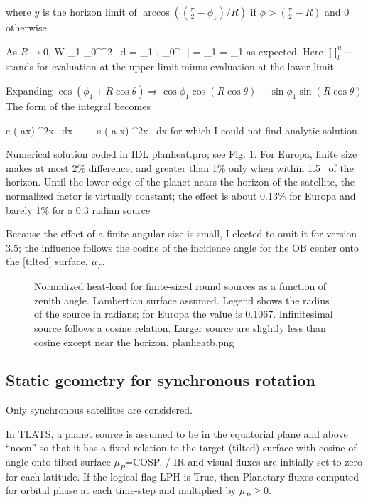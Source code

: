\documentclass{article}
\begin{document}
where  $y $ is the horizon limit of $\arccos \left( (\frac{\pi}{2}-\phi_1)/R \right)$ if $\phi > (\frac{\pi}{2}-R)$ and 0 otherwise.

As $R \rightarrow 0$, 
\qb W  \rightarrow  {} \cos \phi_1 \int_0^\pi \sin^2 \theta \ d \theta
 =  \cos \phi_1   \left. \coprod_0^\pi {}-  \right] 
=  \cos \phi_1 \cdot {}  = \cos \phi_1  \qe
as expected. Here $ \coprod _l^u \cdots \ ] $ stands for evaluation at the upper
  limit minus evaluation at the lower limit

\vspace{2mm}

Expanding $ \cos (\phi_1 + R \cos \theta ) \Rightarrow  \cos \phi_1 \cos( R \cos \theta ) -   \sin \phi_1 \sin( R \cos \theta ) $ The form of the integral becomes 

\qb c \int \cos ( a\cos x) \sin^2x \ dx \ + \ s \int  \sin ( a \cos x) \sin^2x \ dx \qe
 for which I could not find analytic solution.

Numerical solution coded in IDL planheat.pro; see Fig. \ref{planheatb}. For
Europa, finite size makes at most 2\% difference, and greater than 1\% only when
within 1.5\qd~ of the horizon.  Until the lower edge of the planet nears the
horizon of the satellite, the normalized factor is virtually constant; the
effect is about 0.13\% for Europa and barely 1\% for a 0.3 radian source

Because the effect of a finite angular size is small, I elected to omit it for
version 3.5; the influence follows the cosine of the incidence angle for the OB
center onto the [tilted] surface, $\mu_P$.
 
\begin{figure}[!ht] 
\caption[Effect of extended size of planet]{Normalized heat-load for
  finite-sized round sources as a function of zenith angle. Lambertian surface
  assumed. Legend shows the radius of the source in radians; for Europa the
  value is 0.1067. Infinitesimal source follows a cosine relation. Larger source
  are slightly less than cosine except near the horizon.
\label{planheatb}  planheatb.png }
\end{figure} 
\subsection{Static geometry for synchronous rotation}
 Only synchronous satellites are considered.

In TLATS, a planet source is assumed to be in the equatorial plane and above
``noon'' so that it has a fixed relation to the target (tilted) surface with
cosine of angle onto tilted surface $\mu_P$=COSP.  / IR and visual
fluxes are initially set to zero for each latitude. If the logical flag LPH is
True, then Planetary fluxes computed for orbital phase at each time-step and
multiplied by $\mu_P \geq 0$.
\end{document}
